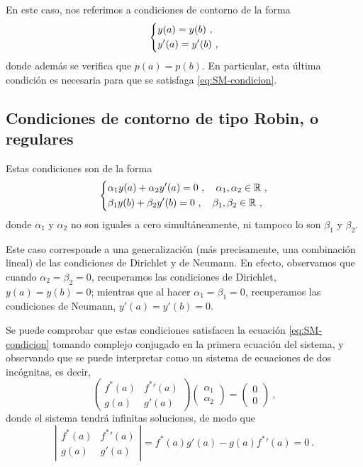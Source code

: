 En este caso, nos referimos a condiciones de contorno de la forma
\begin{equation}
    \begin{dcases}
        y(a) = y(b) \ , \\
        y'(a) = y'(b) \ ,
    \end{dcases}
\end{equation}
donde además se verifica que $p(a) = p(b)$. En particular, esta última condición es necesaria para que se satisfaga \eqref{eq:SM-condicion}.

\subsection{Condiciones de contorno de tipo Robin, o regulares}

Estas condiciones son de la forma
\begin{equation}
    \begin{dcases}
        \alpha_1 y(a) + \alpha_2 y'(a) = 0 \ , \quad \alpha_1, \alpha_2 \in \mathbb{R} \ , \\
        \beta_1 y(b) + \beta_2 y'(b) = 0 \ , \quad \beta_1, \beta_2 \in \mathbb{R} \ , 
    \end{dcases}
\end{equation}
donde $\alpha_1$ y $\alpha_2$ no son iguales a cero simultáneamente, ni tampoco lo son $\beta_1$ y $\beta_2$.

Este caso corresponde a una generalización (más precisamente, una combinación lineal) de las condiciones de Dirichlet y de Neumann. En efecto, observamos que cuando $\alpha_2 = \beta_2 = 0$, recuperamos las condiciones de Dirichlet, $y(a) = y(b) = 0$; mientras que al hacer $\alpha_1 = \beta_1 = 0$, recuperamos las condiciones de Neumann, $y'(a) = y'(b) = 0$.

Se puede comprobar que estas condiciones satisfacen la ecuación \eqref{eq:SM-condicion} tomando complejo conjugado en la primera ecuación del sistema, y observando que se puede interpretar como un sistema de ecuaciones de dos incógnitas, es decir,
\begin{equation}
    \begin{pmatrix}
        f^\ast(a) & {f^\ast}'(a) \\ g(a) & g'(a)
    \end{pmatrix}
    \begin{pmatrix}
        \alpha_1 \\ \alpha_2
    \end{pmatrix}
    = 
    \begin{pmatrix}
        0 \\ 0
    \end{pmatrix} \ ,
\end{equation}
donde el sistema tendrá infinitas soluciones, de modo que
\begin{equation}
    \left| \begin{array}{cc}
        f^\ast(a) & {f^\ast}'(a) \\ g(a) & g'(a)
    \end{array}
    \right| = f^\ast(a) g'(a) - g(a) {f^\ast}'(a) = 0 \ .
\end{equation}

